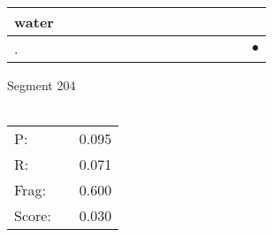 \documentclass[landscape]{article}
\newcommand{\ssp}{\hspace{2pt}}
\newcommand{\mex}{\cellcolor{g}$\bullet$}
\begin{document}
\begin{tabular}{|l|p{10pt}|p{10pt}|p{10pt}|p{10pt}|p{10pt}|p{10pt}|p{10pt}|p{10pt}|p{10pt}|p{10pt}|p{10pt}|p{10pt}|p{10pt}|p{10pt}|}
\hline
\ssp water \ssp&\hspace{2pt}&\hspace{2pt}&\hspace{2pt}&\hspace{2pt}&\hspace{2pt}&\hspace{2pt}&\hspace{2pt}&\hspace{2pt}&\hspace{2pt}&\hspace{2pt}&\hspace{2pt}&\hspace{2pt}&\hspace{2pt}&\hspace{2pt}\\
\hline
\ssp \cellcolor{ref13}. \ssp&\hspace{2pt}&\hspace{2pt}&\hspace{2pt}&\hspace{2pt}&\hspace{2pt}&\hspace{2pt}&\hspace{2pt}&\hspace{2pt}&\hspace{2pt}&\hspace{2pt}&\hspace{2pt}&\hspace{2pt}&\hspace{2pt}&\hspace{2pt}\mex\\
\hline
\end{tabular}

\vspace{6pt}
\noindent Segment 204\\\\
\noindent\begin{tabular}{lm{12pt}r}
\hline
P:&&0.095\\
R:&&0.071\\
Frag:&&0.600\\
Score:&&0.030\\
\end{tabular}

\newpage
\end{document}
